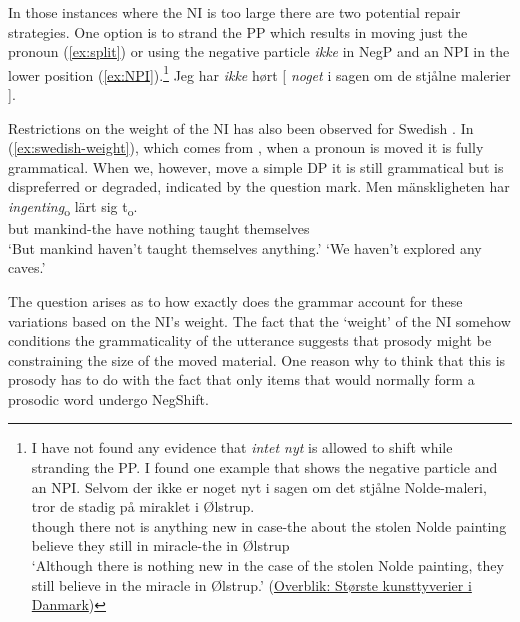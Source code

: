 \documentclass[12pt, letterpaper]{article}
\begin{document}
In those instances where the NI is too large there are two potential repair strategies. One option is to strand the PP which results in moving just the pronoun (\ref{ex:split}) or using the negative particle \textit{ikke} in NegP and an NPI in the lower position (\ref{ex:NPI}).\footnote{I have not found any evidence that \emph{intet nyt} is allowed to shift while stranding the PP. I found one example that shows the negative particle and an NPI. 
\ea
\gll Selvom der ikke er noget nyt i sagen om det stjålne Nolde-maleri, tror de stadig på miraklet i Ølstrup.\\
though there not is anything new in case-the about the stolen {Nolde painting} believe they still in miracle-the in Ølstrup\\
\glt `Although there is nothing new in the case of the stolen Nolde painting, they still believe in the miracle in Ølstrup.' \hfill (\href{https://www.tvmidtvest.dk/midt-og-vestjylland/overblik-storste-kunsttyverier-i-danmark}{Overblik: Største kunsttyverier i Danmark})
\z}
	\ea 
		\ex Jeg har \textit{ikke} hørt [ \textit{noget} i sagen om de stjålne malerier ]. \label{ex:NPI}
		\z 
	\z  

Restrictions on the weight of the NI has also been observed for Swedish \citep{penkaNegativeIndefinites2011}. In (\ref{ex:swedish-weight}), which comes from \citet{penkaNegativeIndefinites2011}, when a pronoun is moved it is fully grammatical. When we, however, move a simple DP it is still grammatical but is dispreferred or degraded, indicated by the question mark. 
	\ea \label{ex:swedish-weight}
		\ea 
		{\gll Men mänskligheten har \textit{ingenting}\textsubscript{o} lärt sig t\textsubscript{o}.\\
		but mankind-the have nothing taught themselves\\}
		\glt `But mankind haven't taught themselves anything.'
		\glt `We haven't explored any caves.'
		\z 
	\z 

The question arises as to how exactly does the grammar account for these variations based on the NI's weight. The fact that the `weight' of the NI somehow conditions the grammaticality of the utterance suggests that prosody might be constraining the size of the moved material. One reason why to think that this is prosody has to do with the fact that only items that would normally form a prosodic word undergo NegShift. 
\end{document}
